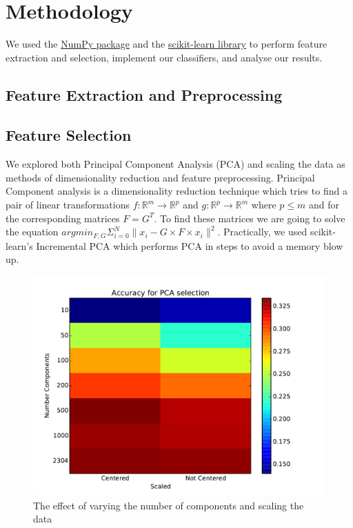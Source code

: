 \documentclass[conference]{IEEEtran}
\begin{document}
\section{Methodology}

We used the \href{http://www.numpy.org/}{NumPy package} and the \href{http://www.scikit-learn.org/}{scikit-learn library} to perform feature extraction and selection, implement our classifiers, and analyse our results. 

\subsection{Feature Extraction and Preprocessing}


\subsection{Feature Selection}

We explored both Principal Component Analysis (PCA) and scaling the data as methods of dimensionality reduction and feature preprocessing. Principal Component analysis is a dimensionality reduction technique which tries to find a pair of linear transformations $f:\mathbb{R}^m\rightarrow\mathbb{R}^p$ and $g:\mathbb{R}^p\rightarrow\mathbb{R}^m$ where $p\leq m$ and for the corresponding matrices $F=G^T$. To find these matrices we are going to solve the equation $argmin_{F,G}\Sigma_{i=0}^N\|x_i-G\times F\times x_i\|^2$. Practically, we used scikit-learn's Incremental PCA which performs PCA in steps to avoid a memory blow up. 

\begin{figure}[Feature preprocessing grid search]
	\centering
	\includegraphics[scale=0.40]{PCA_gridsearch.pdf}
	\caption{The effect of varying the number of components and scaling the data}
	\label{gridsearchpca}
\end{figure}
\end{document}

